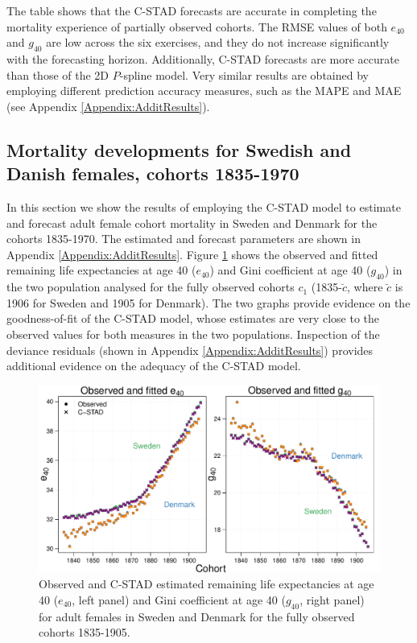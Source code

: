 \documentclass[11pt, a4paper]{article}
\begin{document}
The table shows that the C-STAD forecasts are accurate in completing the mortality experience of partially observed cohorts. The RMSE values of both $e_{40}$ and $g_{40}$  are low across the six exercises, and they do not increase significantly with the forecasting horizon. Additionally, C-STAD forecasts are more accurate than those of the 2D $P$-spline model. Very similar results are obtained by employing different prediction accuracy measures, such as the MAPE and MAE (see Appendix \ref{Appendix:AdditResults}). \par

\subsection{Mortality developments for Swedish and Danish females, cohorts 1835-1970}
\label{Subsec:ForecastC-STAD}
In this section we show the results of employing the C-STAD model to estimate and forecast adult female cohort mortality in Sweden and Denmark for the cohorts 1835-1970. The estimated and forecast parameters are shown in Appendix \ref{Appendix:AdditResults}. Figure \ref{Fig:CSTADfitE40G40} shows the observed and fitted remaining life expectancies at age 40 ($e_{40}$) and Gini coefficient at age 40 ($g_{40}$) in the two population analysed for the fully observed cohorts $c_1$ (1835-$\breve{c}$, where $\breve{c}$ is 1906 for Sweden and 1905 for Denmark). The two graphs provide evidence on the goodness-of-fit of the C-STAD model, whose estimates are very close to the observed values for both measures in the two populations. Inspection of the deviance residuals (shown in Appendix \ref{Appendix:AdditResults}) provides additional evidence on the adequacy of the C-STAD model. \par

\begin{figure}[t]
	\begin{center}
		\includegraphics[scale=0.57]{./Figures/F4.pdf} 
		\caption{Observed and C-STAD estimated remaining life expectancies at age 40 ($e_{40}$, left panel) and Gini coefficient at age 40 ($g_{40}$, right panel) for adult females in Sweden and Denmark for the fully observed cohorts 1835-1905.\label{Fig:CSTADfitE40G40}}    
	\end{center}
\end{figure}
\end{document}
